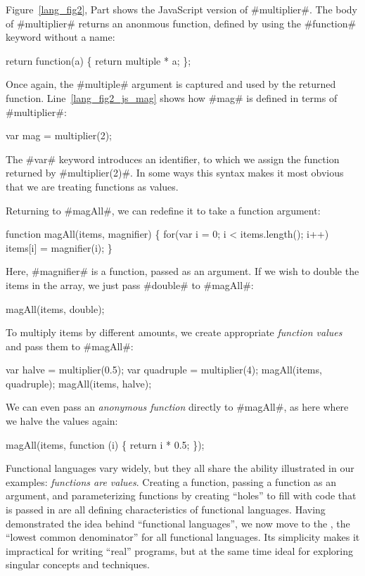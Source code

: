 \documentclass[12pt]{report}
\begin{document}
Figure~\ref{lang_fig2}, Part  shows the JavaScript
version of #multiplier#. The body of #multiplier# returns an anonmous
function, defined by using the #function# keyword without a name:
\begin{AVerb}
  return function(a) \{ 
    return multiple * a;
  \};
\end{AVerb}

Once again, the #multiple# argument is captured and used by the
returned function. Line~\ref{lang_fig2_js_mag} shows how #mag#
is defined in terms of #multiplier#:

\begin{AVerb}
  var mag = multiplier(2);
\end{AVerb}

The #var# keyword introduces an identifier, to which we assign the
function returned by #multiplier(2)#. In some ways this syntax makes
it most obvious that we are treating functions as values.

Returning to #magAll#, we can redefine it to take a function argument:
\begin{AVerb}
function magAll(items, magnifier) \{
  for(var i = 0; i < items.length(); i++)
    items[i] = magnifier(i);
\}
\end{AVerb}
Here, #magnifier# is a function, passed as an argument. If 
we wish to double the items in the array, we just pass #double#
to #magAll#:
\begin{AVerb}
  magAll(items, double);
\end{AVerb}
To multiply items by different amounts, we create appropriate
\emph{function values} and pass them to #magAll#:
\begin{AVerb}
  var halve = multiplier(0.5);
  var quadruple = multiplier(4);
  magAll(items, quadruple);
  magAll(items, halve);
\end{AVerb}
We can even pass an \emph{anonymous function} directly to 
#magAll#, as here where we halve the values again:
\begin{AVerb}
  magAll(items, function (i) \{ return i * 0.5; \});
\end{AVerb}

Functional languages vary widely, but they all share the ability
illustrated in our examples: \emph{functions are values}. Creating a
function, passing a function as an argument, and parameterizing
functions by creating ``holes'' to fill with code that is passed in
are all defining characteristics of functional languages.  Having
demonstrated the idea behind ``functional languages'', we now move to
the \lamA, the ``lowest common denominator'' for all functional
languages. Its simplicity makes it impractical for writing ``real''
programs, but at the same time ideal for exploring singular concepts
and techniques.
\end{document}

